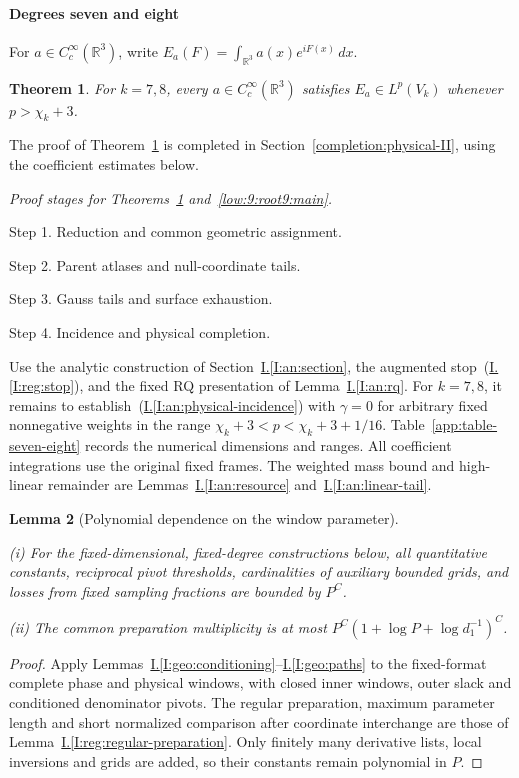 \documentclass[11pt]{amsart}
\newtheorem{theorem}{Theorem}[section]
\newtheorem{lemma}[theorem]{Lemma}
\theoremstyle{definition}
\theoremstyle{remark}
\numberwithin{equation}{section}
\newcommand{\partIref}[1]{\hyperref[I:#1]{I.\ref*{I:#1}}}
\newcommand{\partIeqref}[1]{\textup{(\partIref{#1})}}
\begin{document}
\paragraph{Degrees seven and eight}

For $a\in C_c^\infty(\mathbb R^3)$, write $E_a(F)=\int_{\mathbb R^3}a(x)e^{iF(x)}\,dx$.

\begin{theorem}\label{low:78:s78:main}
For $k=7,8$, every $a\in C_c^\infty(\mathbb R^3)$ satisfies $E_a\in L^p(V_k)$ whenever $p>\chi_k+3$.
\end{theorem}

The proof of Theorem~\ref{low:78:s78:main} is completed in Section~\ref{completion:physical-II}, using the coefficient estimates below.

\par\smallskip
\noindent\textit{Proof stages for Theorems~\ref{low:78:s78:main} and~\ref{low:9:root9:main}.}\par\nobreak
\noindent\textup{Step 1.} Reduction and common geometric assignment.\par\nobreak
\noindent\textup{Step 2.} Parent atlases and null-coordinate tails.\par\nobreak
\noindent\textup{Step 3.} Gauss tails and surface exhaustion.\par\nobreak
\noindent\textup{Step 4.} Incidence and physical completion.\par\nobreak
\smallskip

Use the analytic construction of Section~\partIref{an:section}, the augmented stop~\partIeqref{reg:stop}, and the fixed RQ presentation of Lemma~\partIref{an:rq}. For $k=7,8$, it remains to establish~\partIeqref{an:physical-incidence} with $\gamma=0$ for arbitrary fixed nonnegative weights in the range $\chi_k+3<p<\chi_k+3+1/16$. Table~\ref{app:table-seven-eight} records the numerical dimensions and ranges. All coefficient integrations use the original fixed frames. The weighted mass bound and high-linear remainder are Lemmas~\partIref{an:resource} and~\partIref{an:linear-tail}.

\begin{lemma}[Polynomial dependence on the window parameter]\label{low:78:s78cf:polynomial}

\noindent\textup{(i)} For the fixed-dimensional, fixed-degree constructions below, all quantitative constants, reciprocal pivot thresholds, cardinalities of auxiliary bounded grids, and losses from fixed sampling fractions are bounded by $P^C$.

\noindent\textup{(ii)} The common preparation multiplicity is at most $P^C(1+\log P+\log d_1^{-1})^C$.
\end{lemma}
\begin{proof}
Apply Lemmas~\partIref{geo:conditioning}--\partIref{geo:paths} to the fixed-format complete phase and physical windows, with closed inner windows, outer slack and conditioned denominator pivots. The regular preparation, maximum parameter length and short normalized comparison after coordinate interchange are those of Lemma~\partIref{reg:regular-preparation}. Only finitely many derivative lists, local inversions and grids are added, so their constants remain polynomial in $P$.
\end{proof}
\end{document}
